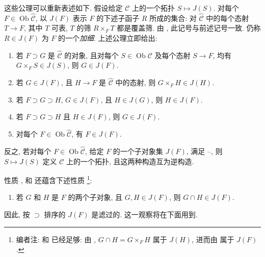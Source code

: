 这些公理可以重新表述如下. 假设给定 \(\mathscr C\) 上的一个拓扑
\(S\mapsto J(S)\). 对每个 \(F\in\operatorname{Ob}\widehat{\mathscr C}\),
以 \(J(F)\) 表示 \(F\) 的下述子函子 \(R\) 所成的集合:
对 \(\widehat{\mathscr C}\) 中的每个态射 \(T\to F\),
其中 \(T\) 可表, \(T\) 的筛 \(R\times_FT\) 都是覆盖筛.
由 , 此记号与前述记号一致.
仍称 \(R\in J(F)\) 为 \(F\) 的一个\emph{加细}.
上述公理立即给出:
\begin{enumerate}
 \item[\((T'0)\)] 若
 \(F\supset G\) 是 \(\widehat{\mathscr C}\) 的对象,
 且对每个 \(S\in\operatorname{Ob}\mathscr C\) 及每个态射 \(S\to F\),
 均有 \(G\times_FS\in J(S)\), 则 \(G\in J(F)\).
 \item[\((T'1)\)] 若
 \(G\in J(F)\), 且 \(H\to F\) 是 \(\widehat{\mathscr C}\) 中的态射,
 则 \(G\times_FH\in J(H)\).
 \item[\((T'2)\)] 若
 \(F\supset G\supset H\), \(G\in J(F)\), 且 \(H\in J(G)\), 则 \(H\in J(F)\).
 \item[\((T'3)\)] 若
 \(F\supset G\supset H\) 且 \(H\in J(F)\), 则 \(G\in J(F)\).
 \item[\((T'4)\)] 对每个
 \(F\in\operatorname{Ob}\widehat{\mathscr C}\), 有 \(F\in J(F)\).
\end{enumerate}
反之, 若对每个 \(F\in\operatorname{Ob}\widehat{\mathscr C}\),
给定 \(F\) 的一个子对象集 \(J(F)\), 满足
--,
则 \(S\mapsto J(S)\) 定义 \(\mathscr C\) 上的一个拓扑,
且这两种构造互为逆构造.

性质 ,
 和
 还蕴含下述性质
\footnote{编者注: 
和  已经足够:
由 ,
\(G\cap H=G\times_FH\) 属于 \(J(H)\), 进而由
 属于 \(J(F)\).}:
\begin{enumerate}
 \item[\((T'5)\)] 若
 \(G\) 和 \(H\) 是 \(F\) 的两个子对象, 且 \(G,H\in J(F)\),
 则 \(G\cap H\in J(F)\).
\end{enumerate}
因此, 按 \(\supset\) 排序的 \(J(F)\) 是滤过的.
这一观察将在下面用到.

